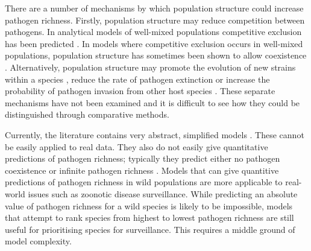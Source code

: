 There are a number of mechanisms by which population structure could increase pathogen richness.
Firstly, population structure may reduce competition between pathogens.
In analytical models of well-mixed populations competitive exclusion has been predicted \cite{ackleh2003competitive, bremermann1989competitive, martcheva2013competitive, qiu2013vector, allen2004sis}.
In models where competitive exclusion occurs in well-mixed populations, population structure has sometimes been shown to allow coexistence \cite{qiu2013vector, allen2004sis, nunes2006localized, garmer2016multistrain}.
Alternatively, population structure may promote the evolution of new strains within a species \cite{buckee2004effects}, reduce the rate of pathogen extinction \cite{rand1995invasion} or increase the probability of pathogen invasion from other host species \cite{nunes2006localized}.
These separate mechanisms have not been examined and it is difficult to see how they could be distinguished through comparative methods.




Currently, the literature contains very abstract, simplified models \cite{qiu2013vector, allen2004sis, garmer2016multistrain, may1994superinfection}.
These cannot be easily applied to real data.
They also do not easily give quantitative predictions of pathogen richness; typically they predict either no pathogen coexistence \cite{bremermann1989competitive, martcheva2013competitive} or infinite pathogen richness \cite{may1994superinfection}.
Models that can give quantitive predictions of pathogen richness in wild populations are more applicable to real-world issues such as zoonotic disease surveillance.
While predicting an absolute value of pathogen richness for a wild species is likely to be impossible, models that attempt to rank species from highest to lowest pathogen richness are still useful for prioritising species for surveillance.
This requires a middle ground of model complexity.

